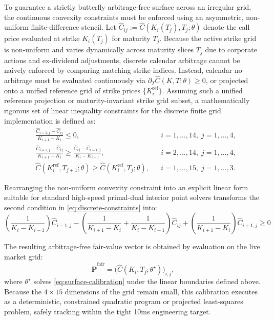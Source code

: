 \documentclass[11pt, a4paper]{article}
\begin{document}
To guarantee a strictly butterfly arbitrage-free surface across an irregular grid, the continuous convexity constraints must be enforced using an asymmetric, non-uniform finite-difference stencil. Let \(\widehat{C}_{ij} := \widehat{C}(K_i(T_j),T_j;\theta)\) denote the call price evaluated at strike $K_i(T_j)$ for maturity $T_j$. Because the active strike grid is non-uniform and varies dynamically across maturity slices $T_j$ due to corporate actions and ex-dividend adjustments, discrete calendar arbitrage cannot be naively enforced by comparing matching strike indices. Instead, calendar no-arbitrage must be evaluated continuously via $\partial_T \widehat{C}(K,T;\theta) \ge 0$, or projected onto a unified reference grid of strike prices $\{K_i^{\mathrm{ref}}\}$. Assuming such a unified reference projection or maturity-invariant strike grid subset, a mathematically rigorous set of linear inequality constraints for the discrete finite grid implementation is defined as:
\begin{equation}
\label{eq:discrete-constraints}
\begin{aligned}
&\frac{\widehat{C}_{i+1,j} - \widehat{C}_{ij}}{K_{i+1} - K_i} \le 0, && i=1,\dots,14,\; j=1,\dots,4, \\
&\frac{\widehat{C}_{i+1,j} - \widehat{C}_{ij}}{K_{i+1} - K_i} \ge \frac{\widehat{C}_{ij} - \widehat{C}_{i-1,j}}{K_i - K_{i-1}}, && i=2,\dots,14,\; j=1,\dots,4, \\
&\widehat{C}(K_i^{\mathrm{ref}}, T_{j+1};\theta) \ge \widehat{C}(K_i^{\mathrm{ref}}, T_j;\theta), && i=1,\dots,15,\; j=1,\dots,3.
\end{aligned}
\end{equation}

Rearranging the non-uniform convexity constraint into an explicit linear form suitable for standard high-speed primal-dual interior point solvers transforms the second condition in \eqref{eq:discrete-constraints} into:
\begin{equation}
\label{eq:lp-convexity}
\left(\frac{1}{K_i - K_{i-1}}\right) \widehat{C}_{i-1,j} - \left(\frac{1}{K_{i+1} - K_i} + \frac{1}{K_i - K_{i-1}}\right) \widehat{C}_{ij} + \left(\frac{1}{K_{i+1} - K_i}\right) \widehat{C}_{i+1,j} \ge 0
\end{equation}

The resulting arbitrage-free fair-value vector is obtained by evaluation on the live market grid:
\[
\widehat{\mathbf{P}}^{\mathrm{fair}}
=
\big(\widehat{C}(K_i,T_j;\theta^\star)\big)_{i,j},
\]
where \(\theta^\star\) solves \eqref{eq:surface-calibration} under the linear boundaries defined above. Because the $4 \times 15$ dimensions of the grid remain small, this calibration executes as a deterministic, constrained quadratic program or projected least-squares problem, safely tracking within the tight 10ms engineering target.
\end{document}
